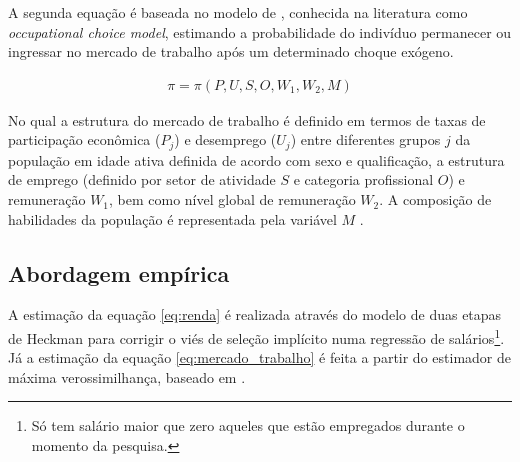 \vspace{0.5cm}

A segunda equação é baseada no modelo de \textcite{ganuza02}, conhecida na literatura como \textit{occupational choice model}, estimando a probabilidade do indivíduo permanecer ou ingressar no mercado de trabalho após um determinado choque exógeno.

\begin{align}
	\pi = \pi \left( P, U, S, O, W_1, W_2, M \right) \label{eq:mercado_trabalho}
\end{align}

No qual a estrutura do mercado de trabalho é definido em termos de taxas de participação econômica ($P_j$) e desemprego ($U_j$) entre diferentes grupos $j$ da população em idade ativa definida de acordo com sexo e qualificação, a estrutura de emprego (definido por setor de atividade $S$ e categoria profissional $O$) e remuneração $W_1$, bem como nível global de remuneração $W_2$. A composição de habilidades da população é representada pela variável $M$ \cite{ganuza07}.

\subsection{Abordagem empírica} \label{abordagem_empirica}

A estimação da equação \ref{eq:renda} é realizada através do modelo de duas etapas de Heckman \cite{heckman79} para corrigir o viés de seleção implícito numa regressão de salários\footnote{Só tem salário maior que zero aqueles que estão empregados durante o momento da pesquisa.}. Já a estimação da equação \ref{eq:mercado_trabalho} é feita a partir do estimador de máxima verossimilhança, baseado em \textcite{colombo08}.


